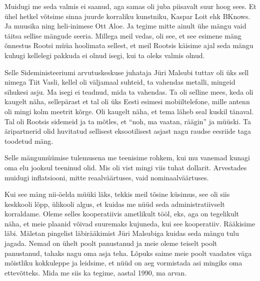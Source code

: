 Muidugi me seda valmis ei saanud, aga samas oli juba piisavalt suur hoog sees. 
Et ühel hetkel võtsime sinna juurde korraliku kunstniku, Kaspar 
Loit ehk BKnows. Ja muusika ning heli-inimese Ott 
Aloe. Ja tegime mitte ainult ühe mängu vaid täitsa 
sellise mängude seeria. Millega meil vedas, oli see, et see esimene mäng 
õnnestus Rootsi müüa hoolimata sellest, et meil Rootsis käisime ajal seda mängu 
kuhugi kellelegi pakkuda ei olnud isegi, kui ta oleks valmis olnud.


Selle Sideministeeriumi arvutuskeskuse juhataja Jüri Malsubi  tuttav oli üks 
sell nimega Tiit Vasli, kellel oli väljamaal suhteid, 
ta vahendas metalli, mingeid sihukesi asju. Ma isegi ei teadnud, mida ta 
vahendas. Ta oli selline mees, keda oli kaugelt näha, sellepärast et tal oli 
üks Eesti esimesi mobiiltelefone, mille antenn oli mingi kolm meetrit kõrge. 
Oli kaugelt näha, et tema läheb seal kuskil tänaval. Tal oli Rootsis sidemeid 
ja ta mõtles, et \enquote{noh, ma vaatan, räägin} ja müüski. Ta äripartnerid 
olid huvitatud sellisest eksootilisest asjast nagu raudse eesriide taga 
toodetud mäng. 

Selle mängumüümise tulemusena me teenisime rohkem, kui mu vanemad kunagi oma 
elu jooksul teeninud olid. Mis oli vist mingi viis tuhat dollarit. Arvestades 
muidugi inflatsiooni, mitte reaalväärtuses, vaid nominaalväärtuses. 

Kui see mäng nii-öelda müüki läks, tekkis meil tõsine küsimus, see oli siis 
keskkooli lõpp, ülikooli algus, et kuidas me nüüd seda administratiivselt 
korraldame. Oleme selles kooperatiivis  ametlikult tööl, eks, aga on tegelikult 
näha, et meie plaanid võivad suuremaks kujuneda, kui see kooperatiiv. Rääkisime 
läbi. Mäletan pingelist läbirääkimist Jüri Malsubiga 
kuidas seda mängu tulu jagada. Nemad on ühelt poolt panustanud ja meie oleme 
teiselt poolt panustanud, tahaks nagu oma asja teha. Lõpuks saime meie poolt 
vaadates väga mõistliku kokkuleppe ja leidsime, et nüüd on aeg vormistada asi 
mingiks oma ettevõtteks. Mida me siis ka tegime, aastal 1990, ma arvan. 


